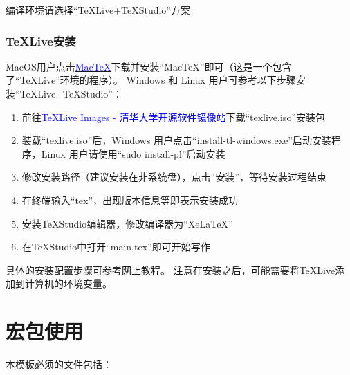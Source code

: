 编译环境请选择“TeXLive+TeXStudio”方案

\subsubsection{TeXLive安装}

MacOS用户点击\href{https://mirror.ctan.org/systems/mac/mactex/MacTeX.pkg}{\textcolor{blue}{MacTeX}}下载并安装“MacTeX”即可（这是一个包含了“TeXLive”环境的程序）。
Windows 和 Linux 用户可参考以下步骤安装“TeXLive+TeXStudio”：
\begin{enumerate}
    \item 前往\href{https://mirrors.tuna.tsinghua.edu.cn/CTAN/systems/texlive/Images/}{\textcolor{blue}{TeXLive Images - 清华大学开源软件镜像站}}下载“texlive.iso”安装包
    \item 装载“texlive.iso”后，Windows 用户点击“install-tl-windows.exe”启动安装程序，Linux 用户请使用“sudo install-pl”启动安装
    \item 修改安装路径（建议安装在非系统盘），点击“安装”，等待安装过程结束
    \item 在终端输入“tex”，出现版本信息等即表示安装成功
    \item 安装TeXStudio编辑器，修改编译器为“XeLaTeX”
    \item 在TeXStudio中打开“main.tex”即可开始写作
\end{enumerate}

具体的安装配置步骤可参考网上教程。
注意在安装之后，可能需要将TeXLive添加到计算机的环境变量。

\section{宏包使用}

本模板必须的文件包括：

